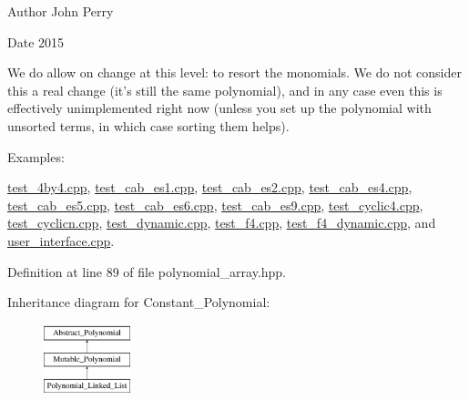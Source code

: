 \begin{DoxyAuthor}{Author}
John Perry 
\end{DoxyAuthor}
\begin{DoxyDate}{Date}
2015
\end{DoxyDate}
We do allow on change at this level\+: to resort the monomials. We do not consider this a real change (it's still the same polynomial), and in any case even this is effectively unimplemented right now (unless you set up the polynomial with unsorted terms, in which case sorting them helps). \begin{Desc}
\item[Examples\+: ]\par
\hyperlink{test_4by4_8cpp-example}{test\+\_\+4by4.\+cpp}, \hyperlink{test_cab_es1_8cpp-example}{test\+\_\+cab\+\_\+es1.\+cpp}, \hyperlink{test_cab_es2_8cpp-example}{test\+\_\+cab\+\_\+es2.\+cpp}, \hyperlink{test_cab_es4_8cpp-example}{test\+\_\+cab\+\_\+es4.\+cpp}, \hyperlink{test_cab_es5_8cpp-example}{test\+\_\+cab\+\_\+es5.\+cpp}, \hyperlink{test_cab_es6_8cpp-example}{test\+\_\+cab\+\_\+es6.\+cpp}, \hyperlink{test_cab_es9_8cpp-example}{test\+\_\+cab\+\_\+es9.\+cpp}, \hyperlink{test_cyclic4_8cpp-example}{test\+\_\+cyclic4.\+cpp}, \hyperlink{test_cyclicn_8cpp-example}{test\+\_\+cyclicn.\+cpp}, \hyperlink{test_dynamic_8cpp-example}{test\+\_\+dynamic.\+cpp}, \hyperlink{test_f4_8cpp-example}{test\+\_\+f4.\+cpp}, \hyperlink{test_f4_dynamic_8cpp-example}{test\+\_\+f4\+\_\+dynamic.\+cpp}, and \hyperlink{user_interface_8cpp-example}{user\+\_\+interface.\+cpp}.\end{Desc}


Definition at line 89 of file polynomial\+\_\+array.\+hpp.

Inheritance diagram for Constant\+\_\+\+Polynomial\+:\begin{figure}[H]
\begin{center}
\leavevmode
\includegraphics[height=2.000000cm]{group__polygroup}
\end{center}
\end{figure}

